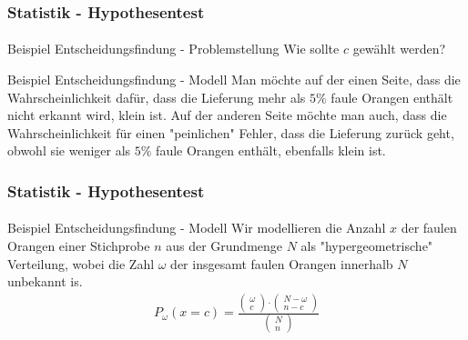 \documentclass{beamer}
\begin{document}
\begin{frame}
    \frametitle{Statistik - Hypothesentest}
\framesubtitle{}
\begin{block}{Beispiel Entscheidungsfindung - Problemstellung}
Wie sollte $c$ gewählt werden?
\end{block}


\begin{block}{Beispiel Entscheidungsfindung - Modell}
Man möchte auf der einen Seite, dass die Wahrscheinlichkeit dafür, dass die Lieferung mehr als $5 \%$ faule Orangen enthält nicht erkannt wird, klein ist.
Auf der anderen Seite möchte man auch, dass die Wahrscheinlichkeit für einen  "peinlichen" Fehler, dass die Lieferung zurück geht, obwohl sie weniger als  $5 \%$ faule Orangen enthält, ebenfalls klein ist. 
\end{block}


 \end{frame}


\begin{frame}
    \frametitle{Statistik - Hypothesentest}
\framesubtitle{}
\begin{block}{Beispiel Entscheidungsfindung - Modell}
Wir modellieren die Anzahl $x$ der faulen Orangen einer Stichprobe $n$ aus der Grundmenge $N$ als "hypergeometrische" Verteilung, wobei die Zahl  $\omega$ der insgesamt faulen  Orangen innerhalb $N$ unbekannt is.
\begin{align*}
P_\omega (x = c)= \frac{\begin{pmatrix} \omega \\ c \end{pmatrix} \cdot  \begin{pmatrix} N - \omega \\ n - c \end{pmatrix}}{\begin{pmatrix} N \\ n \end{pmatrix} }
\end{align*} 
\end{block}


 \end{frame}
\end{document}
